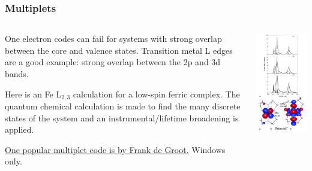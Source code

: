 \documentclass[10pt, xcolor=x11names, compress]{beamer}
\begin{document}
\begin{frame}
  \frametitle{Multiplets}
  \begin{columns}
    \begin{column}{0.65\linewidth}
      One electron codes can fail for systems with strong overlap
      between the core and valence states.  Transition metal L edges
      are a good example: strong overlap between the 2p and 3d bands.

      \bigskip

      Here is an Fe L$_{2,3}$ calculation for a low-spin ferric
      complex.  The quantum chemical calculation is made to find the
      many discrete states of the system and an instrumental/lifetime
      broadening is applied.

      \bigskip

      \href{http://www.anorg.chem.uu.nl/people/staff/FrankdeGroot/ttmultiplets.htm}
      {\color{Blue4}One popular multiplet code is by Frank de Groot.}  Windows only.
    \end{column}
    \begin{column}{0.35\linewidth}
      \includegraphics[width=0.9\linewidth]{images/multiplet.png}

\end{column}
\end{columns}
\end{frame}
\end{document}
